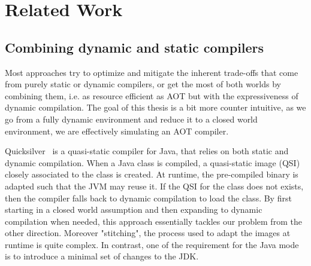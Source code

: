 \chapter{Related Work}

\section{Combining dynamic and static compilers}
Most approaches try to optimize and mitigate the inherent trade-offs that come from purely static or dynamic compilers, or get the most of both worlds by combining them, i.e. as resource efficient as AOT but with the expressiveness of dynamic compilation.
The goal of this thesis is a bit more counter intuitive, as we go from a fully dynamic environment and reduce it to a closed world environment, we are effectively simulating an AOT compiler.

Quicksilver~\cite{serrano_quicksilver_2000} is a quasi-static compiler for Java, that relies on both static and dynamic compilation. 
When a Java class is compiled, a quasi-static image (QSI) closely associated to the class is created. At runtime, the pre-compiled binary is adapted such that the JVM may reuse it. If the QSI for the class does not exists, then the compiler falls back to dynamic compilation to load the class. 
By first starting in a closed world assumption and then expanding to dynamic compilation when needed, this approach essentially tackles our problem from the other direction.
Moreover "stitching", the process used to adapt the images at runtime is quite complex. In contrast, one of the requirement for the Java mode is to introduce a minimal set of changes to the JDK.

